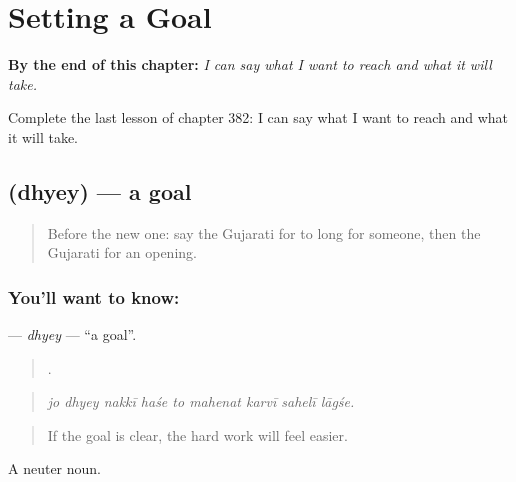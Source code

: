 
\chapter{Setting a Goal}
\label{ch:gu-setting-a-goal}

\begin{chapteropening}
\textbf{By the end of this chapter:} \emph{I can say what I want to reach and what it will take.}

Complete the last lesson of chapter 382: I can say what I want to reach and what it will take.
\end{chapteropening}

\section[\texorpdfstring{\gu{ધ્યેય} (dhyey)}{ધ્યેય (dhyey)}]{ (dhyey) — a goal}

\label{lesson:GU-C382-dhyey}



\begin{quote}
Before the new one: say the Gujarati for to long for someone, then the Gujarati for an opening.
\end{quote}

\subsection*{You'll want to know: }
\textbf{} — \emph{dhyey} — \textquotedblleft{}a goal\textquotedblright{}.

\begin{quote}
        .
\end{quote}

\begin{quote}
\emph{jo dhyey nakkī haśe to mahenat karvī sahelī lāgśe.}
\end{quote}

\begin{quote}
If the goal is clear, the hard work will feel easier.
\end{quote}

A neuter noun.

